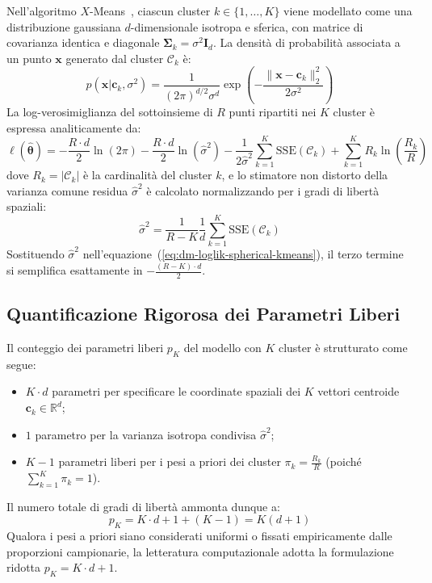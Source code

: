 Nell'algoritmo $X$-Means~\cite{pelleg2000}, ciascun cluster $k \in \{1, \dots, K\}$ viene modellato come una distribuzione gaussiana $d$-dimensionale isotropa e sferica, con matrice di covarianza identica e diagonale $\boldsymbol{\Sigma}_k = \sigma^2 \mathbf{I}_d$. La densità di probabilità associata a un punto $\mathbf{x}$ generato dal cluster $\mathcal{C}_k$ è:
\begin{equation}
\label{eq:dm-spherical-gaussian-pdf}
p(\mathbf{x} | \mathbf{c}_k, \sigma^2) = \frac{1}{(2\pi)^{d/2} \sigma^d} \exp\left( -\frac{\|\mathbf{x} - \mathbf{c}_k\|_2^2}{2\sigma^2} \right)
\end{equation}
La log-verosimiglianza del sottoinsieme di $R$ punti ripartiti nei $K$ cluster è espressa analiticamente da:
\begin{equation}
\label{eq:dm-loglik-spherical-kmeans}
\ell(\hat{\boldsymbol{\theta}}) = -\frac{R \cdot d}{2} \ln(2\pi) - \frac{R \cdot d}{2} \ln(\hat{\sigma}^2) - \frac{1}{2\hat{\sigma}^2} \sum_{k=1}^K \mathrm{SSE}(\mathcal{C}_k) + \sum_{k=1}^K R_k \ln\left(\frac{R_k}{R}\right)
\end{equation}
dove $R_k = |\mathcal{C}_k|$ è la cardinalità del cluster $k$, e lo stimatore non distorto della varianza comune residua $\hat{\sigma}^2$ è calcolato normalizzando per i gradi di libertà spaziali:
\begin{equation}
\label{eq:dm-sigma-sq-unbiased}
\hat{\sigma}^2 = \frac{1}{R - K} \frac{1}{d} \sum_{k=1}^K \mathrm{SSE}(\mathcal{C}_k)
\end{equation}
Sostituendo $\hat{\sigma}^2$ nell'equazione~(\ref{eq:dm-loglik-spherical-kmeans}), il terzo termine si semplifica esattamente in $-\frac{(R - K) \cdot d}{2}$.

\FloatBarrier
\subsection{Quantificazione Rigorosa dei Parametri Liberi}

Il conteggio dei parametri liberi $p_K$ del modello con $K$ cluster è strutturato come segue:
\begin{itemize}
    \item $K \cdot d$ parametri per specificare le coordinate spaziali dei $K$ vettori centroide $\mathbf{c}_k \in \mathbb{R}^d$;
    \item $1$ parametro per la varianza isotropa condivisa $\hat{\sigma}^2$;
    \item $K - 1$ parametri liberi per i pesi a priori dei cluster $\pi_k = \frac{R_k}{R}$ (poiché $\sum_{k=1}^K \pi_k = 1$).
\end{itemize}
Il numero totale di gradi di libertà ammonta dunque a:
\begin{equation}
\label{eq:dm-pk-spherical-count}
p_K = K \cdot d + 1 + (K - 1) = K(d + 1)
\end{equation}
Qualora i pesi a priori siano considerati uniformi o fissati empiricamente dalle proporzioni campionarie, la letteratura computazionale adotta la formulazione ridotta $p_K = K \cdot d + 1$.

